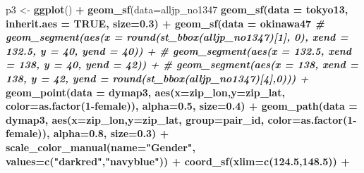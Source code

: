\documentclass[
]{article}
\newenvironment{Shaded}{\begin{snugshade}}{\end{snugshade}}
\newcommand{\CommentTok}[1]{\textcolor[rgb]{0.56,0.35,0.01}{\textit{#1}}}
\newcommand{\DataTypeTok}[1]{\textcolor[rgb]{0.13,0.29,0.53}{#1}}
\newcommand{\DecValTok}[1]{\textcolor[rgb]{0.00,0.00,0.81}{#1}}
\newcommand{\FloatTok}[1]{\textcolor[rgb]{0.00,0.00,0.81}{#1}}
\newcommand{\KeywordTok}[1]{\textcolor[rgb]{0.13,0.29,0.53}{\textbf{#1}}}
\newcommand{\NormalTok}[1]{#1}
\newcommand{\OperatorTok}[1]{\textcolor[rgb]{0.81,0.36,0.00}{\textbf{#1}}}
\newcommand{\OtherTok}[1]{\textcolor[rgb]{0.56,0.35,0.01}{#1}}
\newcommand{\StringTok}[1]{\textcolor[rgb]{0.31,0.60,0.02}{#1}}
\begin{document}
\begin{Shaded}
\begin{Highlighting}[]
\NormalTok{p3 <-}\StringTok{ }\KeywordTok{ggplot}\NormalTok{() }\OperatorTok{+}\StringTok{ }
\StringTok{  }\KeywordTok{geom_sf}\NormalTok{(}\DataTypeTok{data=}\NormalTok{alljp_no1347 }\OperatorTok{%>%}\StringTok{ }\KeywordTok{st_simplify}\NormalTok{(}\DataTypeTok{dTolerance =} \FloatTok{0.01}\NormalTok{), }\DataTypeTok{size=}\FloatTok{0.3}\NormalTok{) }\OperatorTok{+}\StringTok{ }
\StringTok{  }\KeywordTok{geom_sf}\NormalTok{(}\DataTypeTok{data =}\NormalTok{ tokyo13, }\DataTypeTok{inherit.aes =} \OtherTok{TRUE}\NormalTok{, }\DataTypeTok{size=}\FloatTok{0.3}\NormalTok{) }\OperatorTok{+}\StringTok{ }
\StringTok{  }\KeywordTok{geom_sf}\NormalTok{(}\DataTypeTok{data =}\NormalTok{ okinawa47 }\OperatorTok{%>%}\StringTok{ }\KeywordTok{st_simplify}\NormalTok{(}\DataTypeTok{dTolerance =} \FloatTok{0.01}\NormalTok{), }\DataTypeTok{inherit.aes =} \OtherTok{TRUE}\NormalTok{, }\DataTypeTok{size=}\FloatTok{0.3}\NormalTok{) }\OperatorTok{+}\StringTok{   }
\StringTok{  }\CommentTok{# geom_segment(aes(x = round(st_bbox(alljp_no1347)[1], 0), xend = 132.5, y = 40, yend = 40)) + }
\StringTok{  }\CommentTok{# geom_segment(aes(x = 132.5, xend = 138, y = 40, yend = 42)) + }
\StringTok{  }\CommentTok{# geom_segment(aes(x = 138, xend = 138, y = 42, yend = round(st_bbox(alljp_no1347)[4],0))) + }
\StringTok{  }\KeywordTok{geom_point}\NormalTok{(}\DataTypeTok{data =}\NormalTok{ dymap3, }\KeywordTok{aes}\NormalTok{(}\DataTypeTok{x=}\NormalTok{zip_lon,}\DataTypeTok{y=}\NormalTok{zip_lat, }\DataTypeTok{color=}\KeywordTok{as.factor}\NormalTok{(}\DecValTok{1}\OperatorTok{-}\NormalTok{female)), }\DataTypeTok{alpha=}\FloatTok{0.5}\NormalTok{, }\DataTypeTok{size=}\FloatTok{0.4}\NormalTok{) }\OperatorTok{+}\StringTok{ }
\StringTok{  }\KeywordTok{geom_path}\NormalTok{(}\DataTypeTok{data =}\NormalTok{ dymap3, }\KeywordTok{aes}\NormalTok{(}\DataTypeTok{x=}\NormalTok{zip_lon,}\DataTypeTok{y=}\NormalTok{zip_lat, }\DataTypeTok{group=}\NormalTok{pair_id, }\DataTypeTok{color=}\KeywordTok{as.factor}\NormalTok{(}\DecValTok{1}\OperatorTok{-}\NormalTok{female)), }\DataTypeTok{alpha=}\FloatTok{0.8}\NormalTok{, }\DataTypeTok{size=}\FloatTok{0.3}\NormalTok{) }\OperatorTok{+}\StringTok{ }
\StringTok{  }\KeywordTok{scale_color_manual}\NormalTok{(}\DataTypeTok{name=}\StringTok{"Gender"}\NormalTok{, }\DataTypeTok{values=}\KeywordTok{c}\NormalTok{(}\StringTok{"darkred"}\NormalTok{,}\StringTok{"navyblue"}\NormalTok{)) }\OperatorTok{+}\StringTok{ }
\StringTok{  }\KeywordTok{coord_sf}\NormalTok{(}\DataTypeTok{xlim=}\KeywordTok{c}\NormalTok{(}\FloatTok{124.5}\NormalTok{,}\FloatTok{148.5}\NormalTok{)) }\OperatorTok{+}\StringTok{ }
}}
\end{Highlighting}
\end{Shaded}
\end{document}

